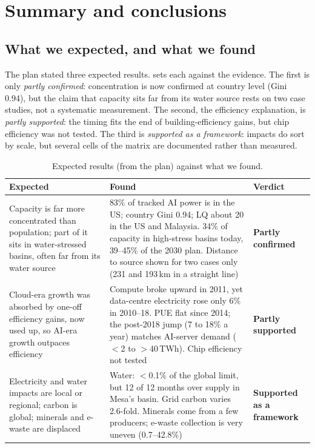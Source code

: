 \section{Summary and conclusions}\label{sec:conclusions}

\subsection{What we expected, and what we found}
The plan stated three expected results.  sets each against the evidence. The first is only
\emph{partly confirmed}: concentration is now confirmed at country level (Gini 0.94), but the claim that capacity sits
far from its water source rests on two case studies, not a systematic measurement. The second, the efficiency
explanation, is \emph{partly supported}: the timing fits the end of building-efficiency gains, but chip efficiency was
not tested. The third is \emph{supported as a framework}: impacts do sort by scale, but several cells of the matrix are
documented rather than measured.

\begin{table}[t]\centering
\caption{Expected results (from the plan) against what we found.}
\label{tab:verdicts}
\footnotesize\renewcommand{\arraystretch}{1.15}
\begin{tabular}{@{}P{2.0cm}P{3.75cm}P{1.6cm}@{}}
\toprule
Expected & Found & Verdict \\
\midrule
Capacity is far more concentrated than population; part of it sits in water-stressed basins, often far from its
water source & 83\% of tracked AI power is in the US; country Gini 0.94; LQ about 20 in the US and Malaysia. 34\% of
capacity in high-stress basins today, 39--45\% of the 2030 plan. Distance to source shown for two cases only (231 and
193\,km in a straight line) & \textbf{Partly confirmed} \\
Cloud-era growth was absorbed by one-off efficiency gains, now used up, so AI-era growth outpaces efficiency &
Compute broke upward in 2011, yet data-centre electricity rose only 6\% in 2010--18. PUE flat since 2014; the post-2018
jump (7 to 18\% a year) matches AI-server demand ($<$2 to $>$40\,TWh). Chip efficiency not tested & \textbf{Partly
supported} \\
Electricity and water impacts are local or regional; carbon is global; minerals and e-waste are displaced & Water:
$<$0.1\% of the global limit, but 12 of 12 months over supply in Mesa's basin. Grid carbon varies 2.6-fold. Minerals
come from a few producers; e-waste collection is very uneven (0.7--42.8\%) & \textbf{Supported as a framework} \\
\bottomrule
\end{tabular}
\end{table}

